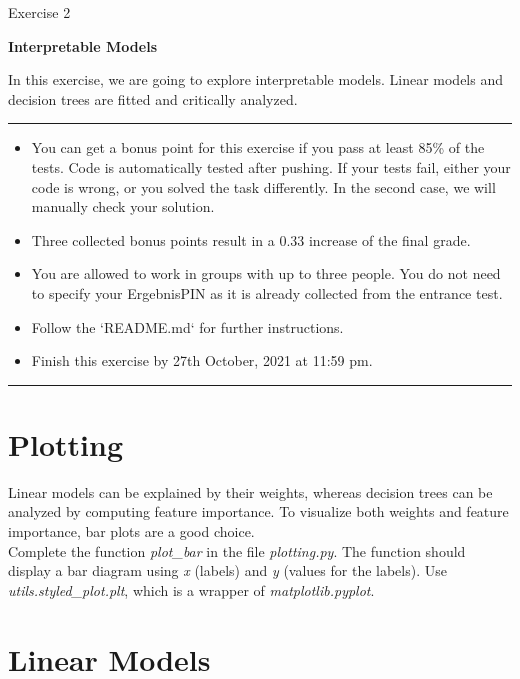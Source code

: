 \documentclass[a4paper]{article}
\begin{document}
{\noindent\LARGE Exercise 2\par}
\vspace{8pt}
{\noindent\huge\textbf{Interpretable Models}}
\vspace{20pt}

\noindent
In this exercise, we are going to explore interpretable models. Linear models and decision trees are fitted and critically analyzed.

\vspace{10pt}
\par\noindent\rule{\textwidth}{0.2pt}
\begin{itemize}
    \item You can get a bonus point for this exercise if you pass at least 85\% of the tests. Code is automatically tested after pushing. If your tests fail, either your code is wrong, or you solved the task differently. In the second case, we will manually check your solution.
    \item Three collected bonus points result in a 0.33 increase of the final grade.
    \item You are allowed to work in groups with up to three people. You do not need to specify your ErgebnisPIN as it is already collected from the entrance test.
    \item Follow the `README.md` for further instructions.
    \item Finish this exercise by 27th October, 2021 at 11:59 pm.
\end{itemize}
\par\noindent\rule{\textwidth}{0.2pt}


\section{Plotting}

\noindent Linear models can be explained by their weights, whereas decision trees can be analyzed by computing feature importance. To visualize both weights and feature importance, bar plots are a good choice.\\

\noindent Complete the function \textit{plot\_bar} in the file \textit{plotting.py}. The function should display a bar diagram using \textit{x} (labels) and \textit{y} (values for the labels). Use \textit{utils.styled\_plot.plt}, which is a wrapper of \textit{matplotlib.pyplot}.


\section{Linear Models}
\end{document}
